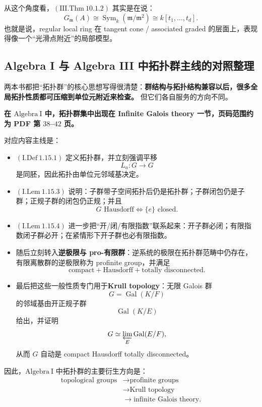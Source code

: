 \documentclass[a4paper]{ctexart}
\theoremstyle{definition}
\theoremstyle{analysis}
\theoremstyle{plain}
\begin{document}
从这个角度看，\((\mathrm{III.Thm}\ 10.1.2)\) 其实是在说：
\[
  G_{\mathfrak m}(A)
  \cong
  \operatorname{Sym}_k(\mathfrak m/\mathfrak m^2)
  \cong
  k[t_1,\dots,t_d].
\]
也就是说，regular local ring 在 tangent cone / associated graded 的层面上，表现得像一个“光滑点附近”的局部模型。

\subsection{Algebra I 与 Algebra III 中拓扑群主线的对照整理}\label{subsec:topic-topological-groups}

两本书都把“拓扑群”的核心思想写得很清楚：\textbf{群结构与拓扑结构兼容以后，很多全局拓扑性质都可压缩到单位元附近来检查。} 但它们各自服务的方向不同。

\medskip

\textbf{在 \(\mathrm{Algebra\ I}\) 中，拓扑群集中出现在 Infinite Galois theory 一节，页码范围约为 PDF 第 \(38\)--\(42\) 页。}

对应内容主线是：
\begin{itemize}
  \item \((\mathrm{I.Def}\ 1.15.1)\) 定义拓扑群，并立刻强调平移
  \[
    L_a:G\to G
  \]
  是同胚，因此拓扑由单位元邻域基决定。
  \item \((\mathrm{I.Lem}\ 1.15.3)\) 说明：子群带子空间拓扑后仍是拓扑群；子群闭包仍是子群；正规子群的闭包仍正规；并且
  \[
    G\text{ Hausdorff}\iff \{e\}\text{ closed}.
  \]
  \item \((\mathrm{I.Lem}\ 1.15.4)\) 进一步把“开/闭/有限指数”联系起来：开子群必闭；有限指数闭子群必开；在紧情形下开子群也必有限指数。
  \item 随后立刻转入\textbf{逆极限与 pro-有限群}：逆系统的极限在拓扑群范畴中仍存在，有限离散群的逆极限称为 profinite group，并满足
  \[
    \text{compact}+\text{Hausdorff}+\text{totally disconnected}.
  \]
  \item 最后把这些一般性质专门用于\textbf{Krull topology}：无限 Galois 群
  \[
    G=\operatorname{Gal}(K/F)
  \]
  的邻域基由开正规子群
  \[
    \operatorname{Gal}(K/E)
  \]
  给出，并证明
  \[
    G\simeq \varprojlim_E \operatorname{Gal}(E/F),
  \]
  从而 \(G\) 自动是 compact Hausdorff totally disconnected。
\end{itemize}

因此，\(\mathrm{Algebra\ I}\) 中拓扑群的主要衍生方向是：
\[
  \begin{aligned}
    \text{topological groups}
    &\longrightarrow
    \text{profinite groups} \\
    &\longrightarrow
    \text{Krull topology} \\
    &\longrightarrow
    \text{infinite Galois theory}.
  \end{aligned}
\]
\end{document}
